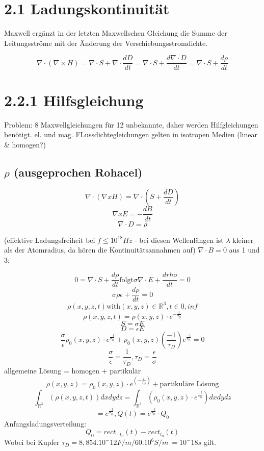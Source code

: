 \documentclass[a4paper]{article}
\begin{document}
\section*{2.1 Ladungskontinuität}
Maxwell ergänzt in der letzten Maxwellschen Gleichung die Summe der Leitungsströme mit der Änderung der Verschiebungsstromdichte.

\[
\nabla \cdot (\nabla \times H) = \nabla \cdot S + \nabla\cdot\frac{dD}{dt}
= \nabla\cdot S + \frac{d\nabla\cdot D}{dt}
= \nabla\cdot S + \frac{d\rho}{dt}
\]

\section*{2.2.1 Hilfsgleichung}
Problem: 8 Maxwellgleichungen für 12 unbekannte, daher werden Hilfgleichungen benötigt.\newline
el. und mag. FLussdichtegleichungen gelten in isotropen Medien (linear \& homogen?)


\subsection*{$\rho$ (ausgeprochen Rohacel)}
\[\nabla\cdot(\nabla x H)=\nabla\cdot (S+\frac{dD}{dt})\]
\[\nabla xE = -\frac{dB}{dt}\]
\[\nabla \cdot D=\rho\]

(effektive Ladungsfreiheit bei $f\le 10^18 Hz$ - bei diesen Wellenlängen ist $\lambda$ kleiner als der Atomradius, da hören die Kontinuitätsannahmen auf)\newline
$\nabla\cdot B=0$\newline
aus 1 und 3:

\[0 = \nabla\cdot S+\frac{d\rho}{dt} \text{folgt} \sigma \nabla\cdot E+\frac{drho}{dt}=0\]
\[\sigma \rho\epsilon+\frac{d\rho}{dt}=0\]
\[\rho (x,y,z,t) \text{with} (x,y,z) \in \mathbb{R}^{3}, t\in 0, inf \]
\[\rho(x,y,z,t)=\rho(x,y,z)\cdot e^{-\frac{t}{\tau_{D}}}\]
\[S = \sigma E\]
\[D=\epsilon E\]
\[\frac{\sigma}{\epsilon} \rho_{0}(x,y,z)\cdot e^{\frac{-t}{\tau_{D}}} + \rho_{0}(x,y,z)(\frac{-1}{\tau_{D}})e^{\frac{-t}{\tau_{D}}}=0\]
\[\frac{\sigma}{\epsilon}= \frac{1}{\tau_{D}}, \tau_{D}=\frac{\epsilon}{\sigma}\]
allgemeine Lösung = homogen + partikulär
\[\rho(x,y,z) = \rho_{0}(x,y,z)\cdot e^(-\frac{t}{\tau_{D}}) + \text{partikuläre Lösung}\]
\[\int_{\mathbb{R}^3}(\rho(x,y,z,t))dxdydz = \int_{\mathbb{R}^2}(\rho_{0}(x,y,z)\cdot e^\frac{-t}{\tau_{D}})dxdydz\]
\[= e^\frac{-t}{\tau_{D}}, Q(t)=e^\frac{-t}{\tau_{D}}\cdot Q_{0}\]
Anfangsladungsverteilung:
\[Q_{0}=rect_{-t_{0}}(t) - rect_{t_{0}}(t)\]
Wobei bei Kupfer $\tau_{D} = 8,854.10^-12 F/m / 60.10^6S/m~=10^-18s$ gilt. 
\end{document}
